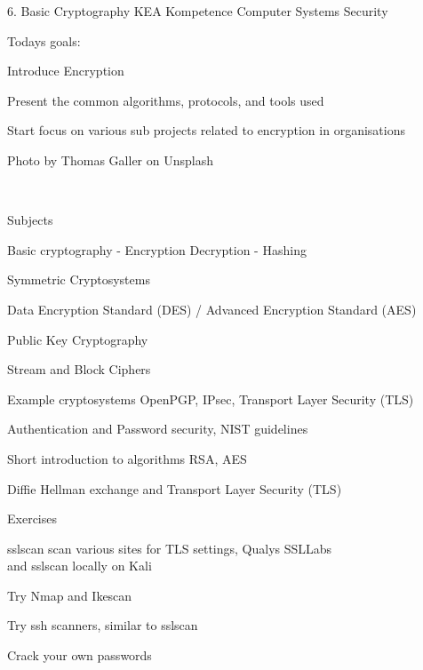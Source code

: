 \documentclass[Screen16to9,17pt]{foils}
\begin{document}
\mytitlepage
{6. Basic Cryptography}
{KEA Kompetence Computer Systems Security \the\year}




Todays goals:
\begin{list2}
\item Introduce Encryption
\item Present the common algorithms, protocols, and tools used
\item Start focus on various sub projects related to encryption in organisations
\end{list2}

{\small Photo by Thomas Galler on Unsplash}


{~}

\begin{list1}
\item Subjects
\begin{list2}
\item Basic cryptography - Encryption Decryption - Hashing
\item Symmetric Cryptosystems
\item Data Encryption Standard (DES) / Advanced Encryption Standard (AES)
\item Public Key Cryptography
\item Stream and Block Ciphers
\item Example cryptosystems OpenPGP, IPsec, Transport Layer Security (TLS)
\item Authentication and Password security, NIST guidelines
\item Short introduction to algorithms RSA, AES
\item Diffie Hellman exchange and Transport Layer Security (TLS)
\end{list2}
\end{list1}

\begin{list1}
\item Exercises
\begin{list2}
\item sslscan scan various sites for TLS settings, Qualys SSLLabs\\
 and sslscan locally on Kali
\item Try Nmap and Ikescan
\item Try ssh scanners, similar to sslscan
\item Crack your own passwords
\end{list2}
\end{list1}
\end{document}
